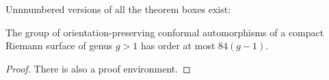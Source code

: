 \documentclass[justified, nofonts, notitlepage, openany]{tufte-book}
\begin{document}
Unnnumbered versions of all the theorem boxes exist:
\begin{proposition*}[Hurwitz][hurwitz]
    The group of orientation-preserving conformal automorphisms of a compact Riemann surface of genus $g > 1$ has order at most $84(g-1)$.
\end{proposition*}
\begin{proof}
    There is also a proof environment.
\end{proof}
\end{document}
